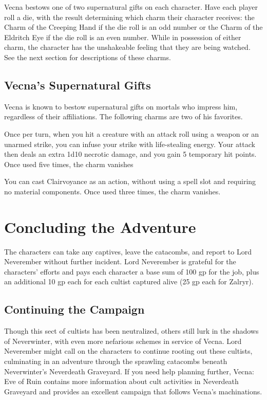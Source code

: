 \documentclass[10pt,a4paper,twoside,fancy,bg=print,twocolumn,openany,nodeprecatedcode]{dndbook}
\begin{document}
Vecna bestows one of two supernatural gifts on each character. Have each player roll a die, with the result determining which charm their character receives: the Charm of the Creeping Hand if the die roll is an odd number or the Charm of the Eldritch Eye if the die roll is an even number. While in possession of either charm, the character has the unshakeable feeling that they are being watched. See the next section for descriptions of these charms.

\subsection{Vecna's Supernatural Gifts}
Vecna is known to bestow supernatural gifts on mortals who impress him, regardless of their affiliations. The following charms are two of his favorites.


Once per turn, when you hit a creature with an attack roll using a weapon or an unarmed strike, you can infuse your strike with life-stealing energy. Your attack then deals an extra 1d10 necrotic damage, and you gain 5 temporary hit points. Once used five times, the charm vanishes

You can cast Clairvoyance as an action, without using a spell slot and requiring no material components. Once used three times, the charm vanishes.

\section{Concluding the Adventure}
The characters can take any captives, leave the catacombs, and report to Lord Neverember without further incident. Lord Neverember is grateful for the characters' efforts and pays each character a base sum of 100 gp for the job, plus an additional 10 gp each for each cultist captured alive (25 gp each for Zalryr).

\subsection{Continuing the Campaign}
Though this sect of cultists has been neutralized, others still lurk in the shadows of Neverwinter, with even more nefarious schemes in service of Vecna. Lord Neverember might call on the characters to continue rooting out these cultists, culminating in an adventure through the sprawling catacombs beneath Neverwinter's Neverdeath Graveyard. If you need help planning further, Vecna: Eve of Ruin contains more information about cult activities in Neverdeath Graveyard and provides an excellent campaign that follows Vecna's machinations.
\end{document}

